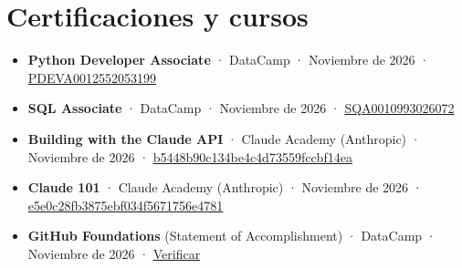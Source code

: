 \section{Certificaciones y cursos}

{\footnotesize
\begin{itemize}
  \item \textbf{Python Developer Associate} · DataCamp · Noviembre de 2026 · \href{https://www.datacamp.com/certificate/PDEVA0012552053199}{PDEVA0012552053199}
  \item \textbf{SQL Associate} · DataCamp · Noviembre de 2026 · \href{https://www.datacamp.com/certificate/SQA0010993026072}{SQA0010993026072}
  \item \textbf{Building with the Claude API} · Claude Academy (Anthropic) · Noviembre de 2026 · \href{https://academy.claude.com/verify/b5448b90c134be4c4d73559fccbf14ea}{b5448b90c134be4c4d73559fccbf14ea}
  \item \textbf{Claude 101} · Claude Academy (Anthropic) · Noviembre de 2026 · \href{https://academy.claude.com/verify/e5e0c28fb3875ebf034f5671756e4781}{e5e0c28fb3875ebf034f5671756e4781}
  \item \textbf{GitHub Foundations} (Statement of Accomplishment) · DataCamp · Noviembre de 2026 · \href{https://www.datacamp.com/completed/statement-of-accomplishment/track/3aca4f111e237751ba02d75b12f75649670f1fbe}{Verificar}
\end{itemize}
}
